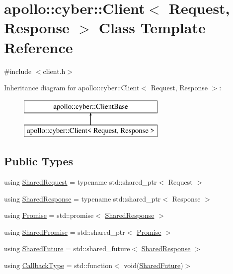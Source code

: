 \hypertarget{classapollo_1_1cyber_1_1Client}{\section{apollo\-:\-:cyber\-:\-:Client$<$ Request, Response $>$ Class Template Reference}
\label{classapollo_1_1cyber_1_1Client}
}


{\ttfamily \#include $<$client.\-h$>$}

Inheritance diagram for apollo\-:\-:cyber\-:\-:Client$<$ Request, Response $>$\-:\begin{figure}[H]
\begin{center}
\leavevmode
\includegraphics[height=2.000000cm]{classapollo_1_1cyber_1_1Client}
\end{center}
\end{figure}
\subsection*{Public Types}
\begin{DoxyCompactItemize}
\item 
using \hyperlink{classapollo_1_1cyber_1_1Client_ac30a67b1a2c1b6d37963968172c290a5}{Shared\-Request} = typename std\-::shared\-\_\-ptr$<$ Request $>$
\item 
using \hyperlink{classapollo_1_1cyber_1_1Client_af6198651a41ac3ed1b8c4c4bdb31bc71}{Shared\-Response} = typename std\-::shared\-\_\-ptr$<$ Response $>$
\item 
using \hyperlink{classapollo_1_1cyber_1_1Client_a0e85359f3942a4fe56bbecba331ed29e}{Promise} = std\-::promise$<$ \hyperlink{classapollo_1_1cyber_1_1Client_af6198651a41ac3ed1b8c4c4bdb31bc71}{Shared\-Response} $>$
\item 
using \hyperlink{classapollo_1_1cyber_1_1Client_aefa3f85f666c6495bdf92c1bacb36802}{Shared\-Promise} = std\-::shared\-\_\-ptr$<$ \hyperlink{classapollo_1_1cyber_1_1Client_a0e85359f3942a4fe56bbecba331ed29e}{Promise} $>$
\item 
using \hyperlink{classapollo_1_1cyber_1_1Client_ae8316f7e75af5319222df2dce376eebc}{Shared\-Future} = std\-::shared\-\_\-future$<$ \hyperlink{classapollo_1_1cyber_1_1Client_af6198651a41ac3ed1b8c4c4bdb31bc71}{Shared\-Response} $>$
\item 
using \hyperlink{classapollo_1_1cyber_1_1Client_a995b86997b158bccf18e65dd077cf406}{Callback\-Type} = std\-::function$<$ void(\hyperlink{classapollo_1_1cyber_1_1Client_ae8316f7e75af5319222df2dce376eebc}{Shared\-Future})$>$
\end{DoxyCompactItemize}
